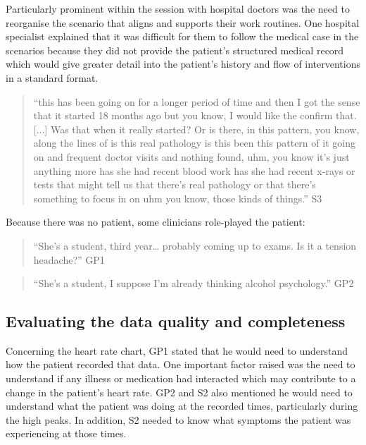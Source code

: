 \documentclass{sigchi}
\begin{document}
Particularly prominent within the session with hospital doctors was the need to reorganise the scenario that aligns and supports their work routines. One hospital specialist explained that it was difficult for them to follow the medical case in the scenarios because they did not provide the patient’s structured medical record which would give greater detail into the patient’s history and flow of interventions in a standard format.

\begin{quote}
    ``this has been going on for a longer period of time and then I got the sense that it started 18 months ago but you know, I would like the confirm that. [...] Was that when it really started? Or is there, in this pattern, you know, along the lines of is this real pathology is this been this pattern of it going on and frequent doctor visits and nothing found, uhm, you know it’s just anything more has she had recent blood work has she had recent x-rays or tests that might tell us that there's real pathology or that there's something to focus in on uhm you know, those kinds of things.'' S3
\end{quote}

Because there was no patient, some clinicians role-played the patient:

\begin{quote}
    ``She's a student, third year… probably coming up to exams. Is it a tension headache?'' GP1
\end{quote}

\begin{quote}
    ``She's a student, I suppose I'm already thinking alcohol psychology.'' GP2
\end{quote}

\subsection{Evaluating the data quality and completeness}

Concerning the heart rate chart, GP1 stated that he would need to understand how the patient recorded that data. One important factor raised was the need to understand if any illness or medication had interacted which may contribute to a change in the patient’s heart rate. GP2 and S2 also mentioned he would need to understand what the patient was doing at the recorded times, particularly during the high peaks. In addition, S2 needed to know what symptoms the patient was experiencing at those times. 
\end{document}
